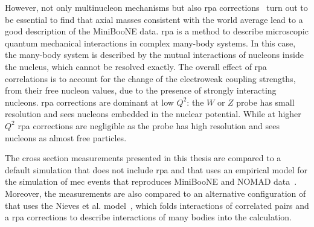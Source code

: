 However, not only multinucleon mechanisms but also \acrfull{rpa} corrections~\cite{nieves} turn out to be essential to find that axial masses consistent with the world average lead to a good description of the MiniBooNE data. 
\acrshort{rpa} is a method to describe microscopic quantum mechanical interactions in complex many-body systems. In this case, the many-body system is described by the mutual interactions of nucleons inside the nucleus, which cannot be resolved exactly. The overall effect of \acrshort{rpa} correlations is to account for the change of the electroweak coupling strengths, from their free nucleon values, due to the presence of strongly interacting nucleons.
\acrshort{rpa} corrections are dominant at low $Q^2$: the $W$ or $Z$ probe has small resolution and sees nucleons embedded in the nuclear potential. While at higher $Q^2$ \acrshort{rpa} corrections are negligible as the probe has high resolution and sees nucleons as almost free particles.

The cross section measurements presented in this thesis are compared to a default \g simulation that does not include \acrshort{rpa} and that uses an empirical model for the simulation of \acrshort{mec} events that reproduces MiniBooNE and NOMAD data~\cite{mec_dytman}. Moreover, the measurements are also compared  to an alternative configuration of \g that uses the Nieves et al. model~\cite{nieves, nieves2}, which folds interactions of correlated pairs and a \acrshort{rpa} corrections to describe interactions of many bodies into the calculation.













